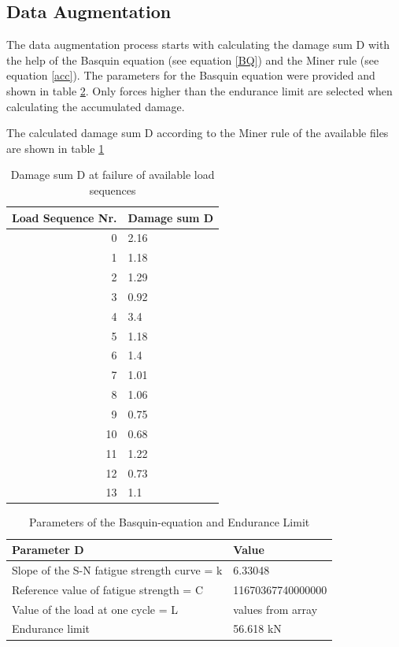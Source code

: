 \subsection{Data Augmentation}
The data augmentation process starts with calculating the damage sum D with the help of the Basquin equation (see equation \ref{BQ}) and the Miner rule (see equation \ref{acc}).
The parameters for the Basquin equation were provided and shown in table \ref{paramBQ}.
Only forces higher than the endurance limit are selected when calculating the accumulated damage.  

The calculated damage sum D according to the Miner rule of the available files are shown in table \ref{DamageSUMS}


\begin{table}
	\begin{center}
		\begin{tabular}{|| r | l ||}
			\hline
			\rule{0pt}{2ex}Load Sequence Nr. & Damage sum D\\
			\hline
			\hline
			\rule{0pt}{2ex}0 & 2.16\\ \hline
			1 & 1.18\\	\hline
			2 & 1.29 \\ \hline
			3 & 0.92\\ \hline
			4 & 3.4 \\ \hline
			5 & 1.18 \\ \hline
			6 & 1.4 \\ \hline
			7 & 1.01 \\ \hline
			8 & 1.06 \\ \hline
			9 & 0.75 \\ \hline
			10 & 0.68 \\ \hline
			11 & 1.22\\ \hline
			12 & 0.73 \\ \hline
			13 & 1.1 \\ \hline
			\hline
		\end{tabular}
		\caption{Damage sum D at failure of available load sequences}
		\label{DamageSUMS}
	\end{center}
	\vspace{-4mm}
\end{table}


\begin{table}
	\begin{center}
		\begin{tabular}{|| l | l ||}
			\hline
			\rule{0pt}{2ex}Parameter D & Value\\
			\hline
			\hline
			\rule{0pt}{2ex}Slope of the S-N fatigue strength curve = k & 6.33048\\ \hline
			Reference value of fatigue strength = C & 11670367740000000\\	\hline
			Value of the load at one cycle = L & values from array \\ \hline
			Endurance limit & 56.618 kN \\ \hline
			\hline
		\end{tabular}
		\caption{Parameters of the Basquin-equation and Endurance Limit}
		\label{paramBQ}
	\end{center}
	\vspace{-4mm}
\end{table}

